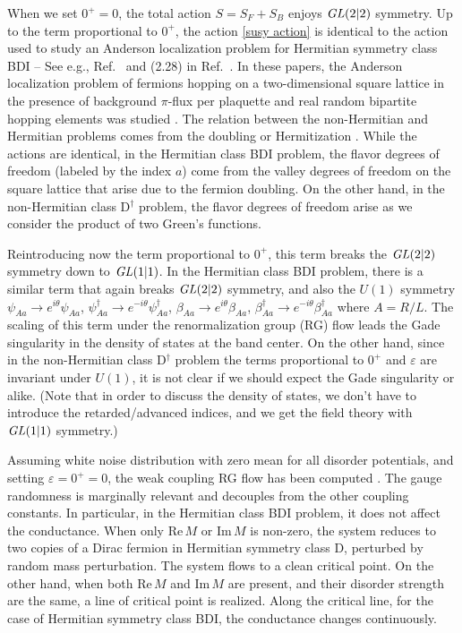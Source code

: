 \documentclass[aps,pra,reprint,superscriptaddress,showkeys,amsmath,amssymb,longbibliography]{revtex4-1}
\begin{document}
When we set $0^+=0$, the total action $S=S_F+S_B$ enjoys ${\it GL}(2|2)$ symmetry.
Up to the term proportional to $0^+$, the action \eqref{susy action} is identical to the action used to study an Anderson localization problem
for Hermitian symmetry class BDI -- See e.g., Ref.\ \cite{2000NuPhB.583..475G} and (2.28) in Ref.\ \cite{2012PhRvB..85w5115R}.
In these papers, the Anderson localization problem of fermions hopping on a two-dimensional square lattice in the presence of background $\pi$-flux per plaquette and real random bipartite hopping elements was studied \cite{1997PhRvB..56.1061H}.
The relation between the non-Hermitian and Hermitian problems comes from the doubling or Hermitization \cite{1997NuPhB.504..579F, 1997PhRvB..56.1061H,1998PhRvL..80.4257M, 2000NuPhB.583..475G, Kawabata2019b, Luoxunlong2021}.
While the actions are identical, in the Hermitian class BDI problem, the flavor degrees of freedom (labeled by the index $a$) come from the valley degrees of freedom on the square lattice that arise due to the fermion doubling.
On the other hand, in the non-Hermitian class D$^{\dag}$ problem, the flavor degrees of freedom arise as we consider the product of two Green's functions.

Reintroducing now the term proportional to $0^+$, this term breaks the ${\it GL}(2|2)$ symmetry down to ${\it GL}(1|1)$. 
In the Hermitian class BDI problem, there is a similar term that again breaks ${\it GL}(2|2)$ symmetry, and also the $U(1)$ symmetry $\psi_{Aa}\to e^{i\theta}\psi_{Aa}$, $\psi^{\dag}_{Aa}\to e^{-i\theta}\psi^{\dag}_{Aa}$, $\beta_{Aa}\to e^{i\theta}\beta_{Aa}$, $\beta^{\dag}_{Aa}\to e^{-i\theta} \beta^{\dag}_{Aa}$ where $A=R/L$.
The scaling of this term under the renormalization group (RG) flow leads the Gade singularity in the density of states at the band center. 
On the other hand, since in the non-Hermitian class D$^{\dag}$ problem the terms proportional to $0^+$ and $\varepsilon$ are invariant under $U(1)$, it is not clear if we should expect the Gade singularity or alike.
(Note that in order to discuss the density of states, we don't have to introduce the retarded/advanced indices, and we get the field theory with ${\it GL}(1|1)$ symmetry.)

Assuming white noise distribution with zero mean for all disorder potentials, and setting $\varepsilon=0^+=0$, the weak coupling RG flow has been computed \cite{2000NuPhB.583..475G, 2012PhRvB..85w5115R}.
The gauge randomness is marginally relevant and decouples from the other coupling constants.
In particular, in the Hermitian class BDI problem, it does not affect the conductance.
When only $\mathrm{Re}\,M$ or $\mathrm{Im}\, M$ is non-zero, the system reduces to two copies of a Dirac fermion in Hermitian symmetry class D, perturbed by random mass perturbation.
The system flows to a clean critical point.
On the other hand, when both $\mathrm{Re}\, M$ and $\mathrm{Im}\, M$ are present, and their disorder strength are the same, a line of critical point is realized.
Along the critical line, for the case of Hermitian symmetry class BDI, the conductance changes continuously.
\end{document}
